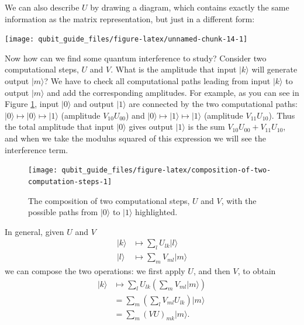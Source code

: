 \documentclass[fleqn,a4paper]{article}
\theoremstyle{definition}
\theoremstyle{definition}
\theoremstyle{definition}
\theoremstyle{definition}
\theoremstyle{remark}
\begin{document}
We can also describe \(U\) by drawing a diagram, which contains exactly the same information as the matrix representation, but just in a different form:

\begin{center}\texttt{[image: qubit\_guide\_files/figure-latex/unnamed-chunk-14-1]} \end{center}

Now how can we find some quantum interference to study?
Consider two computational steps, \(U\) and \(V\).
What is the amplitude that input \(|k\rangle\) will generate output \(|m\rangle\)?
We have to check all computational paths leading from input \(|k\rangle\) to output \(|m\rangle\) and add the corresponding amplitudes.
For example, as you can see in Figure \ref{fig:composition-of-two-computation-steps}, input \(|0\rangle\) and output \(|1\rangle\) are connected by the two computational paths: \(|0\rangle\mapsto|0\rangle\mapsto|1\rangle\) (amplitude \(V_{10}U_{00}\)) and \(|0\rangle\mapsto|1\rangle\mapsto|1\rangle\) (amplitude \(V_{11}U_{10}\)).
Thus the total amplitude that input \(|0\rangle\) gives output \(|1\rangle\) is the sum \(V_{10}U_{00}+V_{11}U_{10}\), and when we take the modulus squared of this expression we will see the interference term.



\begin{figure}[H]

{\centering \texttt{[image: qubit\_guide\_files/figure-latex/composition-of-two-computation-steps-1]} 

}

\caption{The composition of two computational steps, \(U\) and \(V\), with the possible paths from \(|0\rangle\) to \(|1\rangle\) highlighted.}\label{fig:composition-of-two-computation-steps}
\end{figure}

In general, given \(U\) and \(V\)
\[
  \begin{aligned}
    |k\rangle
    &\longmapsto
    \sum_l U_{lk}|l\rangle
  \\|l\rangle
    &\longmapsto
    \sum_m V_{ml}|m\rangle
  \end{aligned}
\]
we can compose the two operations: we first apply \(U\), and then \(V\), to obtain
\[
  \begin{aligned}
    |k\rangle
    &\longmapsto
    \sum_l U_{lk} \left(
      \sum_m V_{ml}|m\rangle
    \right)
  \\&=
    \sum_m \left(
      \sum_l V_{ml}U_{lk}
    \right) |m\rangle
  \\&=
    \sum_m (VU)_{mk} |m\rangle.
  \end{aligned}
\]
\end{document}
